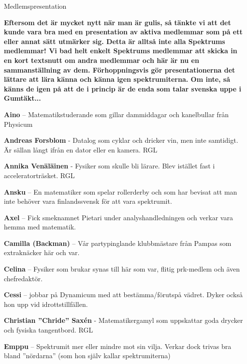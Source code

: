 \documentclass{spektraklet}
\begin{document}
\begin{artikel}


\end{artikel}




\begin{artikel}{Medlemspresentation}{}
\begin{twocolumns}

\textbf{Eftersom det är mycket nytt när man är gulis, så tänkte vi att det kunde vara bra med en presentation av aktiva medlemmar som på ett eller annat sätt utmärker sig. Detta är alltså inte alla Spektrums medlemmar! Vi bad helt enkelt Spektrums medlemmar att skicka in en kort textsnutt om andra medlemmar och här är nu en sammanställning av dem. Förhoppningsvis gör presentationerna det lättare att lära känna och känna igen spektrumiterna. Om inte, så känns de igen på att de i princip är de enda som talar svenska uppe i Gumtäkt...}

\textbf{Aino} – Matematikstuderande som gillar dammiddagar och kanelbullar från Physicum

\textbf{Andreas Forsblom} - Datalog som cyklar och dricker vin, men inte samtidigt. Är sällan långt ifrån en dator eller en kamera. RGL

\textbf{Annika Venäläinen} - Fysiker som skulle bli lärare. Blev istället fast i acceleratorträsket. RGL

\textbf{Ansku} – En matematiker som spelar rollerderby och som har bevisat att man inte behöver vara finlandssvensk för att vara spektrumit.

\textbf{Axel} – Fick smeknamnet Pietari under analyshandledningen och verkar vara hemma med matematik.

\textbf{Camilla (Backman)} – Vår partypinglande klubbmästare från Pampas som extraknäcker här och var.

\textbf{Celina} – Fysiker som brukar synas till här som var, flitig prk-medlem och även chefredaktör.

\textbf{Cessi} – jobbar på Dynamicum med att bestämma/förutspå vädret. Dyker också hon upp vid idrottstillfällen.

\textbf{Christian ”Chride” Saxén} - Matematikergamyl som uppskattar goda drycker och fysiska tangentbord. RGL

\textbf{Emppu} – Spektrumit mer eller mindre mot sin vilja. Verkar dock trivas bra bland ”nördarna” (som hon själv kallar spektrumiterna)


\end{twocolumns}
\end{artikel}
\end{document}
